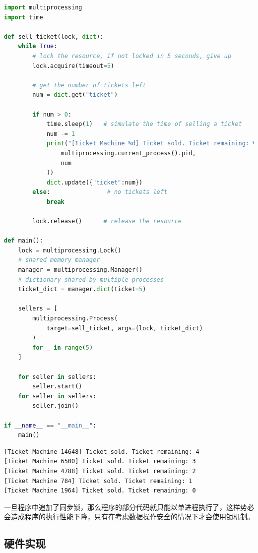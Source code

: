 \begin{lstlisting}[language=Python]
import multiprocessing
import time

def sell_ticket(lock, dict):
    while True:
        # lock the resource, if not locked in 5 seconds, give up
        lock.acquire(timeout=5)
        
        # get the number of tickets left
        num = dict.get("ticket")
        
        if num > 0:
            time.sleep(1)   # simulate the time of selling a ticket
            num -= 1
            print("[Ticket Machine %d] Ticket sold. Ticket remaining: %d" % (
                multiprocessing.current_process().pid,
                num
            ))
            dict.update({"ticket":num})
        else:                # no tickets left
            break
        
        lock.release()      # release the resource

def main():
    lock = multiprocessing.Lock()
    # shared memory manager
    manager = multiprocessing.Manager()
    # dictionary shared by multiple processes
    ticket_dict = manager.dict(ticket=5)

    sellers = [
        multiprocessing.Process(
            target=sell_ticket, args=(lock, ticket_dict)
        ) 
        for _ in range(5)
    ]

    for seller in sellers:
        seller.start()
    for seller in sellers:
        seller.join()

if __name__ == "__main__":
    main()
\end{lstlisting}

\begin{tcolorbox}
    \begin{verbatim}
[Ticket Machine 14648] Ticket sold. Ticket remaining: 4
[Ticket Machine 6500] Ticket sold. Ticket remaining: 3
[Ticket Machine 4788] Ticket sold. Ticket remaining: 2
[Ticket Machine 784] Ticket sold. Ticket remaining: 1
[Ticket Machine 1964] Ticket sold. Ticket remaining: 0
	\end{verbatim}
\end{tcolorbox}

一旦程序中追加了同步锁，那么程序的部分代码就只能以单进程执行了，这样势必会造成程序的执行性能下降，只有在考虑数据操作安全的情况下才会使用锁机制。\\

\subsection{硬件实现}

